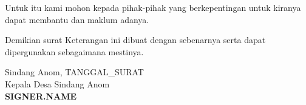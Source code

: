 \documentclass[a4paper, 12pt]{article}
\begin{document}
Untuk itu kami mohon kepada pihak-pihak yang berkepentingan untuk kiranya dapat membantu dan maklum adanya.

Demikian surat Keterangan ini dibuat dengan sebenarnya serta dapat dipergunakan sebagaimana mestinya.

\vspace{1.5cm}

\begin{flushright}
    \begin{minipage}{0.5\textwidth}
        \centering
        Sindang Anom, {{TANGGAL_SURAT}} \\
        Kepala Desa Sindang Anom \\
        \vspace{2.5cm} 
        \textbf{{{SIGNER.NAME}}}
    \end{minipage}
\end{flushright}
\end{document}
